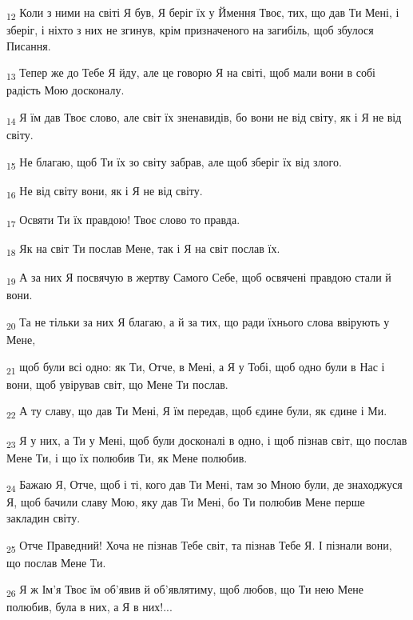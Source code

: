 \begin{tcolorbox}
\textsubscript{12} Коли з ними на світі Я був, Я беріг їх у Ймення Твоє, тих, що дав Ти Мені, і зберіг, і ніхто з них не згинув, крім призначеного на загибіль, щоб збулося Писання.
\end{tcolorbox}
\begin{tcolorbox}
\textsubscript{13} Тепер же до Тебе Я йду, але це говорю Я на світі, щоб мали вони в собі радість Мою досконалу.
\end{tcolorbox}
\begin{tcolorbox}
\textsubscript{14} Я їм дав Твоє слово, але світ їх зненавидів, бо вони не від світу, як і Я не від світу.
\end{tcolorbox}
\begin{tcolorbox}
\textsubscript{15} Не благаю, щоб Ти їх зо світу забрав, але щоб зберіг їх від злого.
\end{tcolorbox}
\begin{tcolorbox}
\textsubscript{16} Не від світу вони, як і Я не від світу.
\end{tcolorbox}
\begin{tcolorbox}
\textsubscript{17} Освяти Ти їх правдою! Твоє слово то правда.
\end{tcolorbox}
\begin{tcolorbox}
\textsubscript{18} Як на світ Ти послав Мене, так і Я на світ послав їх.
\end{tcolorbox}
\begin{tcolorbox}
\textsubscript{19} А за них Я посвячую в жертву Самого Себе, щоб освячені правдою стали й вони.
\end{tcolorbox}
\begin{tcolorbox}
\textsubscript{20} Та не тільки за них Я благаю, а й за тих, що ради їхнього слова ввірують у Мене,
\end{tcolorbox}
\begin{tcolorbox}
\textsubscript{21} щоб були всі одно: як Ти, Отче, в Мені, а Я у Тобі, щоб одно були в Нас і вони, щоб увірував світ, що Мене Ти послав.
\end{tcolorbox}
\begin{tcolorbox}
\textsubscript{22} А ту славу, що дав Ти Мені, Я їм передав, щоб єдине були, як єдине і Ми.
\end{tcolorbox}
\begin{tcolorbox}
\textsubscript{23} Я у них, а Ти у Мені, щоб були досконалі в одно, і щоб пізнав світ, що послав Мене Ти, і що їх полюбив Ти, як Мене полюбив.
\end{tcolorbox}
\begin{tcolorbox}
\textsubscript{24} Бажаю Я, Отче, щоб і ті, кого дав Ти Мені, там зо Мною були, де знаходжуся Я, щоб бачили славу Мою, яку дав Ти Мені, бо Ти полюбив Мене перше закладин світу.
\end{tcolorbox}
\begin{tcolorbox}
\textsubscript{25} Отче Праведний! Хоча не пізнав Тебе світ, та пізнав Тебе Я. І пізнали вони, що послав Мене Ти.
\end{tcolorbox}
\begin{tcolorbox}
\textsubscript{26} Я ж Ім'я Твоє їм об'явив й об'являтиму, щоб любов, що Ти нею Мене полюбив, була в них, а Я в них!...
\end{tcolorbox}
